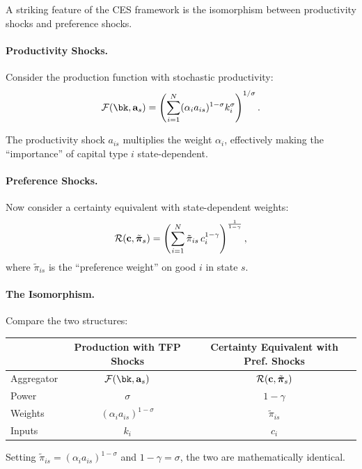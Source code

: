 A striking feature of the CES framework is the isomorphism between productivity shocks and preference shocks.

\paragraph{Productivity Shocks.}
Consider the production function with stochastic productivity:
\begin{equation}
\F(\bk, \ba_s) = \left( \sum_{i=1}^{N} (\alpha_i a_{is})^{1-\sigma} k_i^{\sigma} \right)^{1/\sigma}.
\label{eq:ac-risk-F-tfp}
\end{equation}

The productivity shock $a_{is}$ multiplies the weight $\alpha_i$, effectively making the ``importance'' of capital type $i$ state-dependent.

\paragraph{Preference Shocks.}
Now consider a certainty equivalent with state-dependent weights:
\begin{equation}
\mathcal{R}(\mathbf{c}, \tilde{\boldsymbol{\pi}}_s) = \left( \sum_{i=1}^{N} \tilde{\pi}_{is} \, c_i^{1-\gamma} \right)^{\frac{1}{1-\gamma}},
\label{eq:ac-risk-CE-pref}
\end{equation}
where $\tilde{\pi}_{is}$ is the ``preference weight'' on good $i$ in state $s$.

\paragraph{The Isomorphism.}
Compare the two structures:
\begin{center}
\begin{tabular}{@{}lcc@{}}
\toprule
& \textbf{Production with TFP Shocks} & \textbf{Certainty Equivalent with Pref. Shocks} \\
\midrule
Aggregator & $\F(\bk, \ba_s)$ & $\mathcal{R}(\mathbf{c}, \tilde{\boldsymbol{\pi}}_s)$ \\
Power & $\sigma$ & $1 - \gamma$ \\
Weights & $(\alpha_i a_{is})^{1-\sigma}$ & $\tilde{\pi}_{is}$ \\
Inputs & $k_i$ & $c_i$ \\
\bottomrule
\end{tabular}
\end{center}

Setting $\tilde{\pi}_{is} = (\alpha_i a_{is})^{1-\sigma}$ and $1 - \gamma = \sigma$, the two are mathematically identical.

